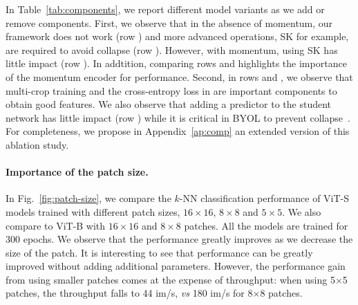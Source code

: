 In Table~\ref{tab:components}, we report different model variants as we add or remove components.
First, we observe that in the absence of momentum, our framework does not work (row ) and more advanced operations, SK for example, are required to avoid collapse (row ).
However, with momentum, using SK has little impact (row ).
In addtition, comparing rows  and  highlights the importance of the momentum encoder for performance.
Second, in rows  and , we observe that multi-crop training and the cross-entropy loss in \OURS are important components to obtain good features.
We also observe that adding a predictor to the student network has little impact (row ) while it is critical in BYOL to prevent collapse~\cite{chen2020exploring,grill2020bootstrap}.
For completeness, we propose in Appendix~\ref{ap:comp} an extended version of this ablation study.

\paragraph{Importance of the patch size.}
In Fig.~\ref{fig:patch-size}, we compare the $k$-NN classification performance of ViT-S models trained with different patch sizes, $16\times 16$, $8\times 8$ and $5\times 5$.
We also compare to ViT-B with $16 \times 16$ and $8\times 8$ patches.
All the models are trained for 300 epochs.
We observe that the performance greatly improves as we decrease the size of the patch.
It is interesting to see that performance can be greatly improved without adding additional parameters.
However, the performance gain from using smaller patches comes at the expense of throughput: when using 5$\times$5 patches, the throughput falls to 44 im/s, \emph{vs} 180 im/s for 8$\times$8 patches.

